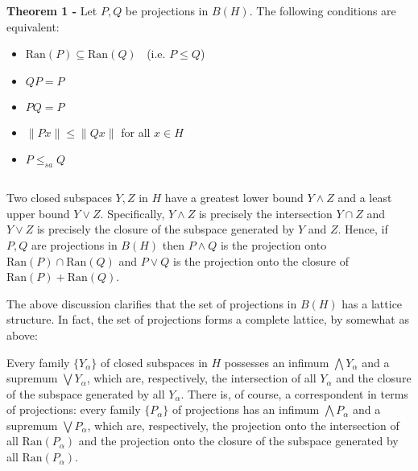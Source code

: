 \documentclass[12pt]{article}
\begin{document}
$\,$

{\bf Theorem 1 -} Let $P, Q$ be projections in $B(H)$. The following conditions are equivalent:
\begin{itemize}
\item $\mathrm{Ran}(P) \subseteq \mathrm{Ran}(Q)\;\;$ (i.e. $P \leq Q$) 
\item $QP = P$
\item $PQ = P$
\item $\|Px\| \leq \|Qx\|$ for all $x \in H$
\item $P \leq_{sa} Q$
\end{itemize}

$\;$

Two closed subspaces $Y, Z$ in $H$ have a greatest lower bound $Y \land Z$ and a least upper bound $Y \lor Z$. Specifically, $Y \land Z$ is precisely the intersection $Y \cap Z$ and $Y \lor Z$ is precisely the closure of the subspace generated by $Y$ and $Z$. Hence, if $P, Q$ are projections in $B(H)$ then $P \land Q$ is the projection onto $\mathrm{Ran}(P) \cap \mathrm{Ran}(Q)$ and $P \lor Q$ is the projection onto the closure of $\mathrm{Ran}(P) + \mathrm{Ran}(Q)$.

The above discussion clarifies that the set of projections in $B(H)$ has a lattice structure. In fact, the set of projections forms a complete lattice, by somewhat  as above:

Every family $\{Y_{\alpha}\}$ of closed subspaces in $H$ possesses an infimum $\bigwedge Y_{\alpha}$ and a supremum $\bigvee Y_{\alpha}$, which are, respectively, the intersection of all $Y_{\alpha}$ and the closure of the subspace generated by all $Y_{\alpha}$. There is, of course, a correspondent in terms of projections: every family $\{P_{\alpha}\}$ of projections has an infimum $\bigwedge P_{\alpha}$ and a supremum $\bigvee P_{\alpha}$, which are, respectively, the projection onto the intersection of all $\mathrm{Ran}(P_{\alpha})$ and the projection onto the closure of the subspace generated by all $\mathrm{Ran}(P_{\alpha})$.
\end{document}
